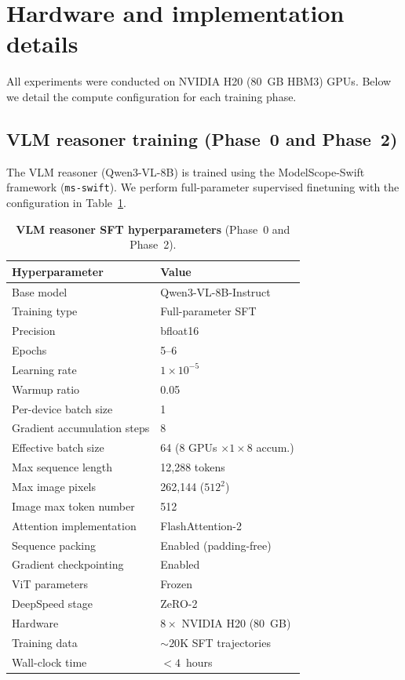 \section{Hardware and implementation details}
\label{app:hardware}
All experiments were conducted on NVIDIA H20 (80~GB HBM3) GPUs.
Below we detail the compute configuration for each training phase.

\subsection{VLM reasoner training (Phase~0 and Phase~2)}
The VLM reasoner (Qwen3-VL-8B) is trained using the ModelScope-Swift framework (\texttt{ms-swift}).
We perform full-parameter supervised finetuning with the configuration in Table~\ref{tab:app_reasoner_sft}.

\begin{table}[t]
  \centering
  \caption{\textbf{VLM reasoner SFT hyperparameters} (Phase~0 and Phase~2).}
  \label{tab:app_reasoner_sft}
  \small
  \begin{tabularx}{\linewidth}{lX}
    \toprule
    \textbf{Hyperparameter} & \textbf{Value} \\
    \midrule
    Base model & Qwen3-VL-8B-Instruct \\
    Training type & Full-parameter SFT \\
    Precision & bfloat16 \\
    Epochs & 5--6 \\
    Learning rate & $1\times 10^{-5}$ \\
    Warmup ratio & 0.05 \\
    Per-device batch size & 1 \\
    Gradient accumulation steps & 8 \\
    Effective batch size & 64 ($8$ GPUs $\times 1 \times 8$ accum.) \\
    Max sequence length & 12{,}288 tokens \\
    Max image pixels & 262{,}144 ($512^2$) \\
    Image max token number & 512 \\
    Attention implementation & FlashAttention-2 \\
    Sequence packing & Enabled (padding-free) \\
    Gradient checkpointing & Enabled \\
    ViT parameters & Frozen \\
    DeepSpeed stage & ZeRO-2 \\
    Hardware & $8 \times$ NVIDIA H20 (80~GB) \\
    Training data & ${\sim}20$K SFT trajectories \\
    Wall-clock time & ${<}4$~hours \\
    \bottomrule
  \end{tabularx}
\end{table}

